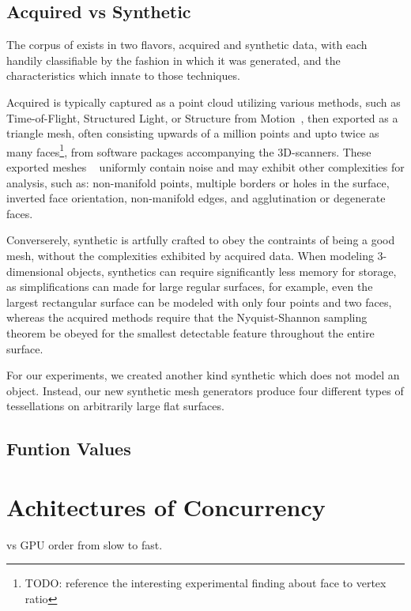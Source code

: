 \subsection{Acquired vs Synthetic \tdd{}}
\label{chBsSvA}
The corpus of \tdd{} exists in two flavors, acquired and synthetic data, with each handily classifiable by the fashion in which it was generated, and the characteristics which innate to those techniques.

Acquired \tdd{} is typically captured as a point cloud utilizing various methods, such as Time-of-Flight, Structured Light, or Structure from Motion~\cite[p.~19]{Mara12}, then exported as a triangle mesh, often consisting upwards of a million points and upto twice as many faces\footnote{TODO: reference the interesting experimental finding about face to vertex ratio}, from software packages accompanying the 3D-scanners. These exported meshes ~\cite[p.~25]{Mara12} uniformly contain noise and may exhibit other complexities for analysis, such as: non-manifold points, multiple borders or holes in the surface, inverted face orientation, non-manifold edges, and agglutination or degenerate faces. ~\cite[p.~28-32]{Mara12}

Converserely, synthetic \tdd{} is artfully crafted to obey the contraints of being a good mesh, without the complexities exhibited by acquired data. When modeling 3-dimensional objects, synthetics can require significantly less memory for storage, as simplifications can made for large regular surfaces, for example, even the largest rectangular surface can be modeled with only four points and two faces, whereas the acquired methods require that the Nyquist-Shannon sampling theorem be obeyed for the smallest detectable feature throughout the entire surface.

For our experiments, we created another kind synthetic \tdd{} which does not model an object. Instead, our new synthetic mesh generators produce four different types of tessellations on arbitrarily large flat surfaces.

%
\subsection{Funtion Values}
\label{chBsFV}
%
%
%
%
%
\section{Achitectures of Concurrency}
 vs GPU order from slow to fast.
%
